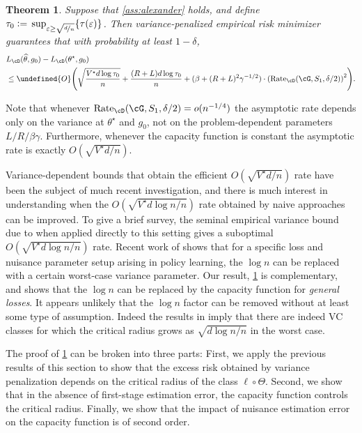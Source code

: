 \documentclass[11pt]{article} %
\newcommand{\pref}[1]{\cref{#1}}
\theoremstyle{theorem}  %
\newtheorem{theorem}{Theorem}
\theoremstyle{plain}
\DeclarePairedDelimiter{\crl}{\{}{\}}
\DeclarePairedDelimiter{\prn}{(}{)}
\newcommand{\ls}{\ell}
\newcommand{\veps}{\varepsilon}
\newcommand{\ldef}{\vcentcolon=}
\newcommand{\wt}[1]{\widetilde{#1}}
\newcommand{\wh}[1]{\widehat{#1}}
\let\wt\undefined
\newcommand{\wt}[1]{\widetilde{#1}}
\newcommand{\Ot}{\wt{O}}
\newcommand{\littleo}{o}
\newcommand{\poprisk}{L_{\cD}}
\newcommand{\esttwo}{\wh{\theta}}
\newcommand{\nuisance}{\cG}
\newcommand{\target}{\Theta}
\newcommand{\Rate}{\mathrm{Rate}_{\cD}}
\newcommand{\besttwo}{\theta^{\star}}
\newcommand{\gtone}{g_0}
\newcommand{\sampleone}{S_1}
\begin{document}
\begin{theorem}
\label{thm:alexander}
Suppose that \pref{ass:alexander} holds, and define $\tau_0\ldef{}\sup_{\veps\geq{}\sqrt{\nicefrac{d}{n}}}\crl{\tau(\veps)}$.
Then variance-penalized empirical risk minimizer guarantees that with probability at least $1-\delta$,
\begin{align*}
\label{eq:policy_alexander}
&\poprisk(\esttwo,\gtone) - \poprisk(\besttwo,\gtone)\\
&\leq{} \Ot\prn*{\sqrt{\frac{V^{\star}d\log\tau_0}{n}} + \frac{(R+L)d\log\tau_0}{n} + (\beta + (R+L)^{2}\gamma^{-1/2})\cdot\prn*{\Rate(\nuisance,\sampleone,\delta/2)}^{2}}.
\end{align*}
\end{theorem}
Note that whenever $\Rate(\nuisance,\sampleone,\delta/2)=\littleo(n^{-1/4})$ the asymptotic rate depends only on the variance at $\besttwo$ and $\gtone$, not on the problem-dependent parameters $L/R/\beta\gamma$. Furthermore, whenever the capacity function is constant the asymptotic rate is exactly $O(\sqrt{V^{\star}d/n})$.

Variance-dependent bounds that obtain the efficient $O(\sqrt{V^{\star}d/n})$ rate have been the subject of much recent investigation, and there is much interest in understanding when the $O(\sqrt{V^{\star}d\log{}n/n})$ rate obtained by naive approaches can be improved. To give a brief survey, the seminal empirical variance bound due to \cite{maurer2009empirical} when applied directly to this setting gives a suboptimal $O(\sqrt{V^{\star}d\log{}n/n})$ rate. Recent work of \cite{athey2017efficient} shows that for a specific loss and nuisance parameter setup arising in policy learning, the $\log{}n$ can be replaced with a certain worst-case variance parameter. Our result, \pref{thm:alexander} is complementary, and shows that the $\log{}n$ can be replaced by the capacity function for \emph{general losses}. It appears unlikely that the $\log{}n$ factor can be removed without at least some type of assumption. Indeed the results in \cite{rakhlin2017empirical} imply that there are indeed VC classes for which the critical radius grows as $\sqrt{d\log{}n/n}$ in the worst case.

The proof of \pref{thm:alexander} can be broken into three parts: First, we apply the previous results of this section to show that the excess risk obtained by variance penalization depends on the critical radius of the class $\ls\circ\target$. Second, we show that in the absence of first-stage estimation error, the capacity function controls the critical radius. Finally, we show that the impact of nuisance estimation error on the capacity function is of second order.
\end{document}
